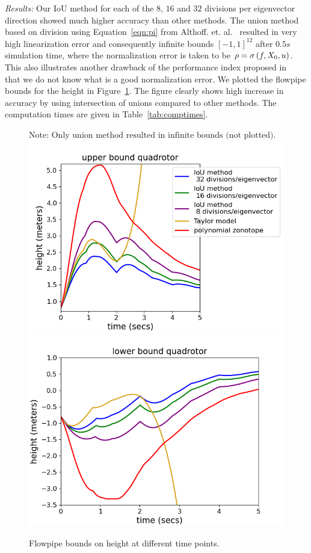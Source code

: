 \emph{Results:}  Our IoU method for each of the $8$, $16$ and $32$ divisions per
  eigenvector direction showed much higher accuracy than other
  methods.  The union method based on division using
  Equation~\ref{eqn:pi} from
  Althoff. et. al.~\cite{althoff2013reachability} resulted in very
  high linearization error and consequently infinite bounds
  $[-1,1]^{12}$ after $0.5 s$ simulation time, where the normalization
  error is taken to be $\rho = \sigma\left(f,X_0,u\right)$.  This also
  illustrates another drawback of the performance index proposed
  in~\cite{althoff2013reachability} that we do not know what is a good
  normalization error.  We plotted the flowpipe bounds for the height
  in Figure~\ref{fig:flowquadrotor}.  The figure clearly shows high
  increase in accuracy by using intersection of unions compared to
  other methods.  The computation times are given in Table~\ref{tab:comptimes}.
%
\begin{figure}
{\normalsize $\text{Note: Only union method resulted in infinite bounds (not plotted).}$}
\includegraphics[scale = 0.65]{quadrotorImages/ubToolHeight.png}\vspace{-0.4em}
\includegraphics[scale = 0.6]{quadrotorImages/lbToolHeight.png}
\caption{Flowpipe bounds on height at different time points.}\label{fig:flowquadrotor}
\end{figure}
